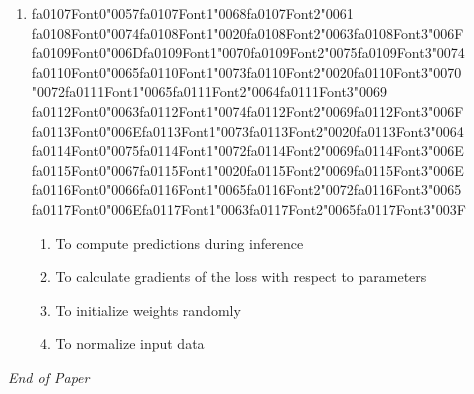 \documentclass[12pt]{article}
\begin{document}
\begin{enumerate}[label=Q\arabic*.]
\item {\csname fa0107Font0\endcsname\char"0057}{\csname fa0107Font1\endcsname\char"0068}{\csname fa0107Font2\endcsname\char"0061} {\csname fa0108Font0\endcsname\char"0074}{\csname fa0108Font1\endcsname\char"0020}{\csname fa0108Font2\endcsname\char"0063}{\csname fa0108Font3\endcsname\char"006F} {\csname fa0109Font0\endcsname\char"006D}{\csname fa0109Font1\endcsname\char"0070}{\csname fa0109Font2\endcsname\char"0075}{\csname fa0109Font3\endcsname\char"0074} {\csname fa0110Font0\endcsname\char"0065}{\csname fa0110Font1\endcsname\char"0073}{\csname fa0110Font2\endcsname\char"0020}{\csname fa0110Font3\endcsname\char"0070} {\char"0072}{\csname fa0111Font1\endcsname\char"0065}{\csname fa0111Font2\endcsname\char"0064}{\csname fa0111Font3\endcsname\char"0069} {\csname fa0112Font0\endcsname\char"0063}{\csname fa0112Font1\endcsname\char"0074}{\csname fa0112Font2\endcsname\char"0069}{\csname fa0112Font3\endcsname\char"006F} {\csname fa0113Font0\endcsname\char"006E}{\csname fa0113Font1\endcsname\char"0073}{\csname fa0113Font2\endcsname\char"0020}{\csname fa0113Font3\endcsname\char"0064} {\csname fa0114Font0\endcsname\char"0075}{\csname fa0114Font1\endcsname\char"0072}{\csname fa0114Font2\endcsname\char"0069}{\csname fa0114Font3\endcsname\char"006E} {\csname fa0115Font0\endcsname\char"0067}{\csname fa0115Font1\endcsname\char"0020}{\csname fa0115Font2\endcsname\char"0069}{\csname fa0115Font3\endcsname\char"006E} {\csname fa0116Font0\endcsname\char"0066}{\csname fa0116Font1\endcsname\char"0065}{\csname fa0116Font2\endcsname\char"0072}{\csname fa0116Font3\endcsname\char"0065} {\csname fa0117Font0\endcsname\char"006E}{\csname fa0117Font1\endcsname\char"0063}{\csname fa0117Font2\endcsname\char"0065}{\csname fa0117Font3\endcsname\char"003F}
\begin{enumerate}[label=(\Alph*)]
    \item To compute predictions during inference
    \item To calculate gradients of the loss with respect to parameters
    \item To initialize weights randomly
    \item To normalize input data
\end{enumerate}
\end{enumerate}

\vfill
\noindent\textit{End of Paper}
\end{document}
